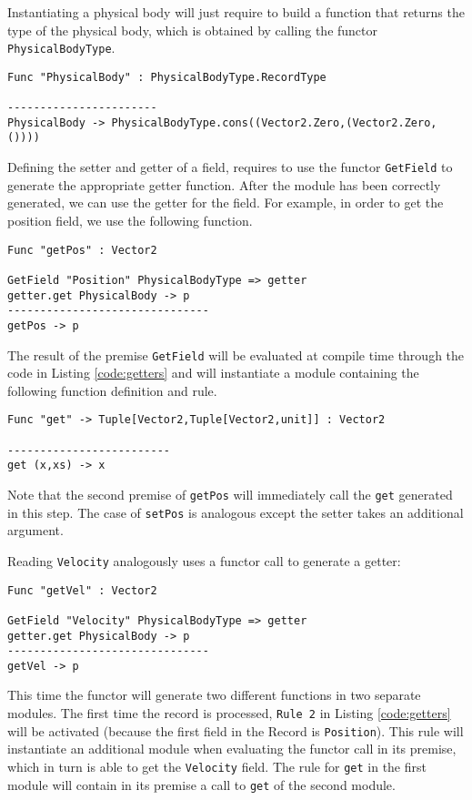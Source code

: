 Instantiating a physical body will just require to build a function that returns the type of the physical body, which is obtained by calling the functor \texttt{PhysicalBodyType}.

\begin{lstlisting}
Func "PhysicalBody" : PhysicalBodyType.RecordType

-----------------------
PhysicalBody -> PhysicalBodyType.cons((Vector2.Zero,(Vector2.Zero,())))
\end{lstlisting}

Defining the setter and getter of a field, requires to use the functor \texttt{GetField} to generate the appropriate getter function. After the module has been correctly generated, we can use the getter for the field. For example, in order to get the position field, we use the following function.

\begin{lstlisting}
Func "getPos" : Vector2

GetField "Position" PhysicalBodyType => getter
getter.get PhysicalBody -> p
-------------------------------
getPos -> p
\end{lstlisting}

The result of the premise \texttt{GetField} will be evaluated at compile time through the code in Listing \ref{code:getters} and will instantiate a module containing the following function definition and rule.

\begin{lstlisting}
Func "get" -> Tuple[Vector2,Tuple[Vector2,unit]] : Vector2

-------------------------
get (x,xs) -> x
\end{lstlisting}

\noindent
Note that the second premise of \texttt{getPos} will immediately call the \texttt{get} generated in this step. The case of \texttt{setPos} is analogous except the setter takes an additional argument.

Reading \texttt{Velocity} analogously uses a functor call to generate a getter:

\begin{lstlisting}
Func "getVel" : Vector2

GetField "Velocity" PhysicalBodyType => getter
getter.get PhysicalBody -> p
-------------------------------
getVel -> p
\end{lstlisting}

\noindent
This time the functor will generate two different functions in two separate modules. The first time the record is processed, \texttt{Rule 2} in Listing \ref{code:getters} will be activated (because the first field in the Record is \texttt{Position}). This rule will instantiate an additional module when evaluating the functor call in its premise, which in turn is able to get the \texttt{Velocity} field. The rule for \texttt{get} in the first module will contain in its premise a call to  \texttt{get} of the second module.

